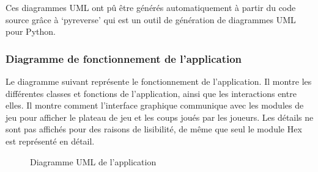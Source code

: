 Ces diagrammes UML ont pû être générés automatiquement à partir du code source grâce à 
`pyreverse' qui est un outil de génération de diagrammes UML pour Python.

\subsubsection{Diagramme de fonctionnement de l'application}

Le diagramme suivant représente le fonctionnement de l'application. Il montre les différentes
classes et fonctions de l'application, ainsi que les interactions entre elles.
Il montre comment l'interface graphique communique avec les modules de jeu pour afficher
le plateau de jeu et les coups joués par les joueurs. Les détails ne sont pas affichés
pour des raisons de lisibilité, de même que seul le module Hex est représenté en détail.

\begin{figure}[!htb]
    \centering
    \caption{Diagramme UML de l'application}\label{Fig:UML_app}
\end{figure}

